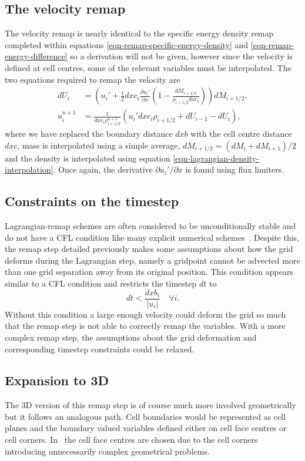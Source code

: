 \subsection{The velocity remap}
\label{sec-remap-velocity}
The velocity remap is nearly identical to the specific energy density remap completed within equations \eqref{eqn-remap-specific-energy-density} and \eqref{eqn-remap-energy-difference} so a derivation will not be given, however since the velocity is defined at cell centres, some of the relevant variables must be interpolated. The two equations required to remap the velocity are 
\begin{align}
  dU_i &= \left( u_i' + \frac{1}{2}dxc_i\frac{\partial u_i'}{\partial x} \left( 1 - \frac{dM_{i+1/2}}{\rho_{i+1/2} dxc_i} \right) \right)dM_{i+1/2},\\
  u_i^{n+1}  &= \frac{1}{dxc_i \rho_{i+1/2}^{n+1}}(u_i' dxc_i \rho_{i+1/2} + dU_{i-1} - dU_i),
\end{align}
where we have replaced the boundary distance $dxb$ with the cell centre distance $dxc$, mass is interpolated using a simple average, $dM_{i+1/2} = (dM_{i} + dM_{i+1})/2$ and the density is interpolated using equation \eqref{eqn-lagrangian-density-interpolation}. Once again, the derivative $\partial u_i' / \partial x$ is found using flux limiters. 

\subsection{Constraints on the timestep}
Lagrangian-remap schemes are often considered to be unconditionally stable and do not have a CFL condition like many explicit numerical schemes~\cite{batesMultiplyUpstreamSemiLagrangianAdvective1982}. Despite this, the remap step detailed previously makes some assumptions about how the grid deforms during the Lagrangian step, namely a gridpoint cannot be advected more than one grid separation away from its original position. This condition appears similar to a CFL condition and restricts the timestep $dt$ to
\begin{equation}
  \label{eq:grid_condition1}
  dt < \frac{dxb_i}{|u_i|}\quad \forall i.
\end{equation}
Without this condition a large enough velocity could deform the grid so much that the remap step is not able to correctly remap the variables. With a more complex remap step, the assumptions about the grid deformation and corresponding timestep constraints could be relaxed.

\subsection{Expansion to 3D}
The 3D version of this remap step is of course much more involved geometrically but it follows an analogous path. Cell boundaries would be represented as cell planes and the boundary valued variables defined either on cell face centres or cell corners. In~\cite{arberStaggeredGridLagrangian2001} the cell face centres are chosen due to the cell corners introducing unnecessarily complex geometrical problems.

